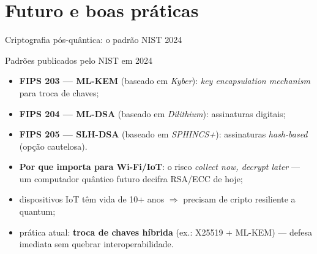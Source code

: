 \documentclass[aspectratio=169,11pt]{beamer}
\begin{document}
\section{Futuro e boas práticas}

\begin{frame}{Criptografia pós-quântica: o padrão NIST 2024}
  \begin{block}{Padrões publicados pelo NIST em 2024}
    \begin{itemize}
      \item \textbf{FIPS 203 --- ML-KEM} (baseado em \emph{Kyber}): \emph{key encapsulation mechanism} para troca de chaves;
      \item \textbf{FIPS 204 --- ML-DSA} (baseado em \emph{Dilithium}): assinaturas digitais;
      \item \textbf{FIPS 205 --- SLH-DSA} (baseado em \emph{SPHINCS+}): assinaturas \emph{hash-based} (opção cautelosa).
    \end{itemize}
  \end{block}
  \pause
  \begin{itemize}
    \item \textbf{Por que importa para Wi-Fi/IoT}: o risco \emph{collect now, decrypt later} --- um computador quântico futuro decifra RSA/ECC de hoje;
    \item dispositivos IoT têm vida de 10+ anos $\Rightarrow$ precisam de cripto resiliente a quantum;
    \item prática atual: \textbf{troca de chaves híbrida} (ex.: X25519 + ML-KEM) --- defesa imediata sem quebrar interoperabilidade.
  \end{itemize}
\end{frame}
\end{document}
